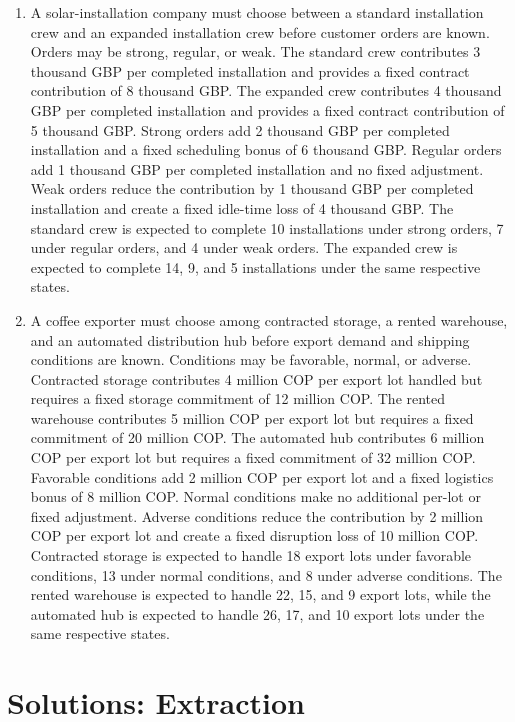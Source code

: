\begin{enumerate}[leftmargin=0.22in]
		\item
		A solar-installation company must choose between a standard installation crew and an expanded installation crew before customer orders are known. Orders may be strong, regular, or weak. The standard crew contributes 3 thousand GBP per completed installation and provides a fixed contract contribution of 8 thousand GBP. The expanded crew contributes 4 thousand GBP per completed installation and provides a fixed contract contribution of 5 thousand GBP. Strong orders add 2 thousand GBP per completed installation and a fixed scheduling bonus of 6 thousand GBP. Regular orders add 1 thousand GBP per completed installation and no fixed adjustment. Weak orders reduce the contribution by 1 thousand GBP per completed installation and create a fixed idle-time loss of 4 thousand GBP. The standard crew is expected to complete 10 installations under strong orders, 7 under regular orders, and 4 under weak orders. The expanded crew is expected to complete 14, 9, and 5 installations under the same respective states.
		
		\item
		A coffee exporter must choose among contracted storage, a rented warehouse, and an automated distribution hub before export demand and shipping conditions are known. Conditions may be favorable, normal, or adverse. Contracted storage contributes 4 million COP per export lot handled but requires a fixed storage commitment of 12 million COP. The rented warehouse contributes 5 million COP per export lot but requires a fixed commitment of 20 million COP. The automated hub contributes 6 million COP per export lot but requires a fixed commitment of 32 million COP. Favorable conditions add 2 million COP per export lot and a fixed logistics bonus of 8 million COP. Normal conditions make no additional per-lot or fixed adjustment. Adverse conditions reduce the contribution by 2 million COP per export lot and create a fixed disruption loss of 10 million COP. Contracted storage is expected to handle 18 export lots under favorable conditions, 13 under normal conditions, and 8 under adverse conditions. The rented warehouse is expected to handle 22, 15, and 9 export lots, while the automated hub is expected to handle 26, 17, and 10 export lots under the same respective states.
		
	\end{enumerate}
	
	\newpage
	\newpage
	\section{Solutions: Extraction}
	\label{sec:solutions-extraction}
\label{toc}
	
